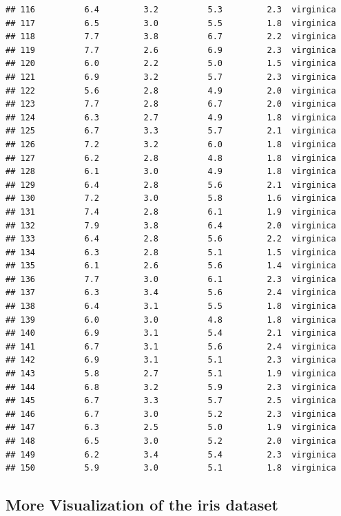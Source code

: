 \documentclass[
]{book}
\begin{document}
\begin{verbatim}
## 116          6.4         3.2          5.3         2.3  virginica
## 117          6.5         3.0          5.5         1.8  virginica
## 118          7.7         3.8          6.7         2.2  virginica
## 119          7.7         2.6          6.9         2.3  virginica
## 120          6.0         2.2          5.0         1.5  virginica
## 121          6.9         3.2          5.7         2.3  virginica
## 122          5.6         2.8          4.9         2.0  virginica
## 123          7.7         2.8          6.7         2.0  virginica
## 124          6.3         2.7          4.9         1.8  virginica
## 125          6.7         3.3          5.7         2.1  virginica
## 126          7.2         3.2          6.0         1.8  virginica
## 127          6.2         2.8          4.8         1.8  virginica
## 128          6.1         3.0          4.9         1.8  virginica
## 129          6.4         2.8          5.6         2.1  virginica
## 130          7.2         3.0          5.8         1.6  virginica
## 131          7.4         2.8          6.1         1.9  virginica
## 132          7.9         3.8          6.4         2.0  virginica
## 133          6.4         2.8          5.6         2.2  virginica
## 134          6.3         2.8          5.1         1.5  virginica
## 135          6.1         2.6          5.6         1.4  virginica
## 136          7.7         3.0          6.1         2.3  virginica
## 137          6.3         3.4          5.6         2.4  virginica
## 138          6.4         3.1          5.5         1.8  virginica
## 139          6.0         3.0          4.8         1.8  virginica
## 140          6.9         3.1          5.4         2.1  virginica
## 141          6.7         3.1          5.6         2.4  virginica
## 142          6.9         3.1          5.1         2.3  virginica
## 143          5.8         2.7          5.1         1.9  virginica
## 144          6.8         3.2          5.9         2.3  virginica
## 145          6.7         3.3          5.7         2.5  virginica
## 146          6.7         3.0          5.2         2.3  virginica
## 147          6.3         2.5          5.0         1.9  virginica
## 148          6.5         3.0          5.2         2.0  virginica
## 149          6.2         3.4          5.4         2.3  virginica
## 150          5.9         3.0          5.1         1.8  virginica
\end{verbatim}

\subsection{More Visualization of the iris dataset}\label{more-visualization-of-the-iris-dataset}
\end{document}
